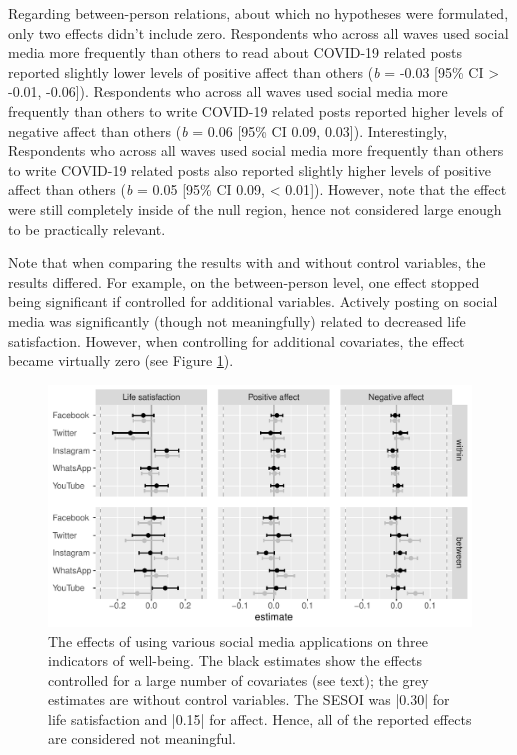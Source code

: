 \documentclass[
  english,
  man,mask,floatsintext]{apa6}
\begin{document}
Regarding between-person relations, about which no hypotheses were formulated, only two effects didn't include zero.
Respondents who across all waves used social media more frequently than others to read about COVID-19 related posts reported slightly lower levels of positive affect than others (\emph{b} = -0.03 {[}95\% CI \textgreater{} -0.01, -0.06{]}).
Respondents who across all waves used social media more frequently than others to write COVID-19 related posts reported higher levels of negative affect than others (\emph{b} = 0.06 {[}95\% CI 0.09, 0.03{]}).
Interestingly, Respondents who across all waves used social media more frequently than others to write COVID-19 related posts also reported slightly higher levels of positive affect than others (\emph{b} = 0.05 {[}95\% CI 0.09, \textless{} 0.01{]}).
However, note that the effect were still completely inside of the null region, hence not considered large enough to be practically relevant.

Note that when comparing the results with and without control variables, the results differed.
For example, on the between-person level, one effect stopped being significant if controlled for additional variables.
Actively posting on social media was significantly (though not meaningfully) related to decreased life satisfaction.
However, when controlling for additional covariates, the effect became virtually zero (see Figure \ref{fig:res-channels}).

\begin{figure}
\includegraphics[width=\textwidth]{figures/fig_results_channel} \caption{The effects of using various social media applications on three indicators of well-being. The black estimates show the effects controlled for a large number of covariates (see text); the grey estimates are without control variables. The SESOI was |0.30| for life satisfaction and |0.15| for affect. Hence, all of the reported effects are considered not meaningful.}\label{fig:res-channels}
\end{figure}
\end{document}
